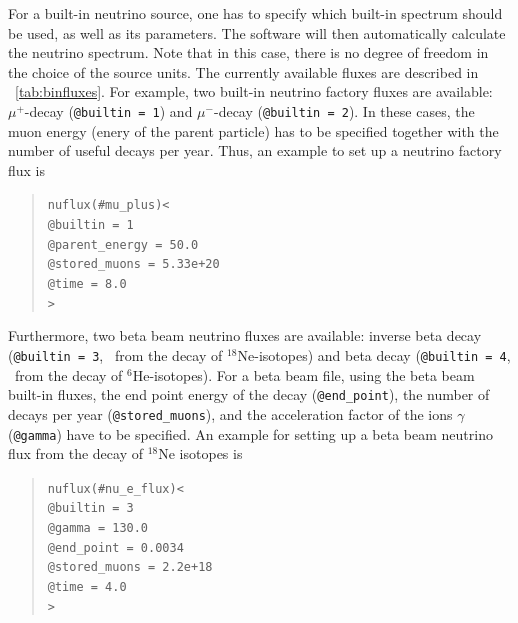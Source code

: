 For a built-in neutrino source, one has to specify which
built-in spectrum should be used, as well as its parameters. The software
will then automatically calculate the neutrino spectrum. Note that in this
case, there is no degree of freedom in the choice of the source units.
The currently available fluxes are described in \Tab~\ref{tab:binfluxes}.
For example, two built-in neutrino factory fluxes are available: $\mu^+$-decay ({\tt @builtin = 1}) and $\mu^-$-decay ({\tt @builtin = 2}). In these cases, the muon energy (enery of the parent particle) has to be specified together with the number of useful decays  per year. Thus, an example to set up a neutrino factory flux is 
\begin{quote}
{\tt nuflux(\#mu\_plus)<\\
\tb  @builtin = 1\\
\tb  @parent\_energy = 50.0\\
\tb  @stored\_muons = 5.33e+20\\
\tb  @time = 8.0\\
>}
\end{quote}
%
Furthermore, two beta beam neutrino fluxes are available: inverse beta decay ({\tt @builtin = 3}, \ie\ from the decay of
$^{18}$Ne-isotopes) and beta decay ({\tt @builtin = 4}, \ie\ from the decay of $^{6}$He-isotopes). For a beta beam file, using
the beta beam built-in fluxes, the end point energy of the decay ({\tt @end\_point}), the number of decays per year 
({\tt @stored\_muons}), and the acceleration factor of the ions $\gamma$ ({\tt @gamma}) have to be specified. An example for
setting up a beta beam neutrino flux from the decay of $^{18}$Ne isotopes is
\begin{quote}
{\tt nuflux(\#nu\_e\_flux)<\\
\tb  @builtin = 3\\
\tb  @gamma = 130.0\\
\tb  @end\_point = 0.0034\\
\tb  @stored\_muons = 2.2e+18\\
\tb  @time = 4.0\\
>}
\end{quote}
%
